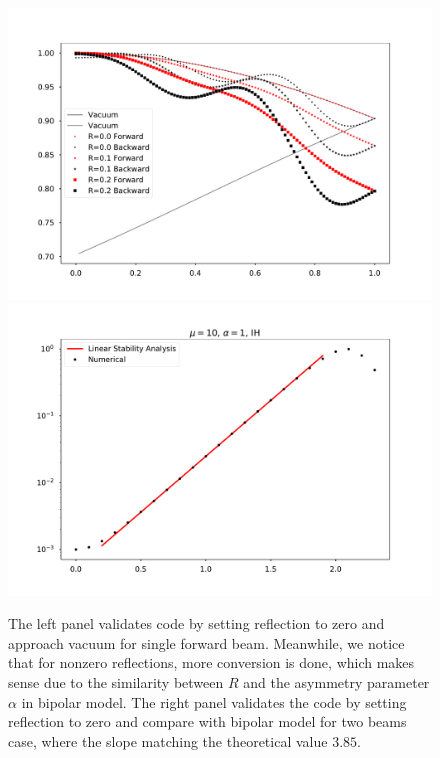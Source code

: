 \begin{figure}
    \includegraphics[width=\textwidth]{chapters/assets/halo/halo-mu-4-r-multiple.pdf}
    \endminipage\hfill
    \includegraphics[width=\textwidth]{chapters/assets/halo/halo-mu-4-compare-bipolar.pdf}
    \endminipage\hfill
    \caption{The left panel validates code by setting reflection to zero and approach vacuum for single forward beam. Meanwhile, we notice that for nonzero reflections, more conversion is done, which makes sense due to the similarity between $R$ and the asymmetry parameter $\alpha$ in bipolar model. The right panel validates the code by setting reflection to zero and compare with bipolar model for two beams case, where the slope matching the theoretical value $3.85$.}
    \label{chap:halo-sec:num-fig:compare-vac-bipolar}
\end{figure}

